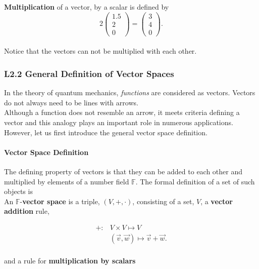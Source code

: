 \documentclass[11pt, oneside]{article}   	%
\begin{document}
  \textbf{Multiplication} of a vector, by a scalar is defined by  \\
  
  \[ 2 \begin{pmatrix} 1.5\\2\\0 \end{pmatrix} = \begin{pmatrix} 3\\4\\0\end{pmatrix}. \] \\
  
  Notice that the vectors can not be multiplied with each other. 

\subsubsection{L2.2 General Definition of Vector Spaces}

In the theory of quantum mechanics, \textit{functions} are considered as
vectors. Vectors do not always need to be lines with arrows. \\

Although a function does not resemble an arrow, it meets criteria defining
a vector and this analogy plays an important role in numerous applications. \\

However, let us first introduce the general vector space definition. 

\paragraph{Vector Space Definition} 

The defining property of vectors is that they can be added to each other and
multiplied by elements of a number field $\mathbb{F}$. The formal definition of
a set of such objects is \\

An $\mathbb{F}$-\textbf{vector space} is a triple, $(V, +, \cdot)$, consisting
of a set, $V$, a \textbf{vector addition} rule, 

\begin{align*}
  + : &V \times V \mapsto V \\
      &(\vec{v}, \vec{w} ) \mapsto \vec{v} + \vec{w}. 
\end{align*}\\ 

and a rule for \textbf{multiplication by scalars}
\end{document}
